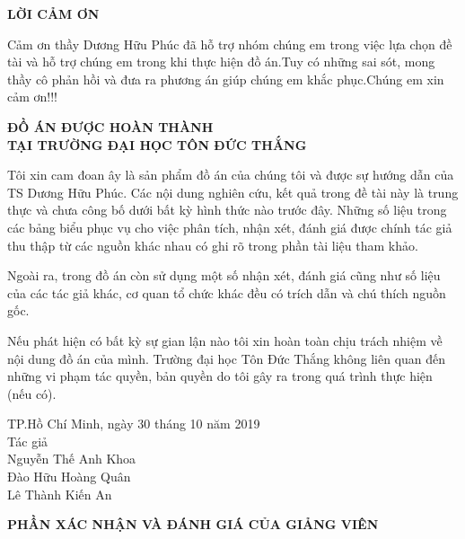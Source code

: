 \documentclass{article}
\begin{document}
\begin{center}
    \fontsize{16}{20}\selectfont
    \textbf{LỜI CẢM ƠN\\}
\end{center}
    \fontsize{14}{20}\selectfont
    \setlength{\parindent}{1cm} 

Cảm ơn thầy Dương Hữu Phúc đã hỗ
trợ nhóm chúng em trong việc lựa chọn đề tài và hỗ trợ chúng em trong khi thực hiện đồ án.Tuy có những sai sót, mong thầy cô phản hồi và đưa ra phương án giúp chúng em khắc phục.Chúng em xin cảm ơn!!!
\setcounter{page}{1}
\pagebreak
\begin{center}
    \fontsize{16}{20}\selectfont
    \textbf{ĐỒ ÁN ĐƯỢC HOÀN THÀNH\\}
    \textbf{TẠI TRƯỜNG ĐẠI HỌC TÔN ĐỨC THẮNG}
\end{center}
\fontsize{14}{20}\selectfont

Tôi xin cam đoan ây là sản phẩm đồ án của chúng tôi và được sự hướng dẫn của TS Dương Hữu Phúc. Các nội dung nghiên cứu, kết quả trong đề tài này là trung thực và chưa công bố dưới bất kỳ hình thức nào trước đây. Những số liệu trong các bảng biểu phục vụ cho việc phân tích, nhận xét, đánh giá được chính tác giả thu thập từ các nguồn khác nhau có ghi rõ trong phần tài liệu tham khảo.

Ngoài ra, trong đồ án còn sử dụng một số nhận xét, đánh giá cũng như số liệu của các tác giả khác, cơ quan tổ chức khác đều có trích dẫn và chú thích nguồn gốc.

Nếu phát hiện có bất kỳ sự gian lận nào tôi xin hoàn toàn chịu trách nhiệm về nội dung đồ án của mình. Trường đại học Tôn Đức Thắng không liên quan đến những vi phạm tác quyền, bản quyền do tôi gây ra trong quá trình thực hiện (nếu có).

\begin{flushright}
TP.Hồ Chí Minh, ngày 30 tháng 10 năm 2019\\
    Tác giả \\
    
    Nguyễn Thế Anh Khoa\\
    
    Đào Hữu Hoàng Quân\\
    
    Lê Thành Kiến An
\end{flushright}
\pagebreak
\begin{center}
    \fontsize{16}{20}\selectfont
    \textbf{PHẦN XÁC NHẬN VÀ ĐÁNH GIÁ CỦA GIẢNG VIÊN}
\end{center}
\fontsize{14}{20}
\end{document}
